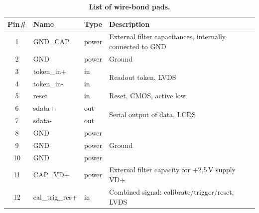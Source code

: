 \begin{table}[ht]
    \begin{center}
	\caption{\textbf{List of wire-bond pads.} }
	\label{tab:ROCpinout}

	\bigskip

	{\scriptsize
	\begin{tabular}{clll}
	\toprule %
	Pin\# & Name         & Type & Description \\
	\midrule %
	 1 & GND\_CAP        & power & External filter capacitances, internally connected to GND \\
	\midrule %
	 2 & GND             & power  & Ground \\
	\midrule %
	 3 & token\_in+      & in  & \multirow{2}{*}{Readout token, LVDS} \\
	 4 & token\_in-      & in  & \\
	\midrule %
	 5 & $\overline{\mathrm{reset}}$           & in  & Reset, CMOS, active low\\
	\midrule %
	 6 & sdata+           & out & \multirow{2}{*}{Serial output of data, LCDS} \\
	 7 & sdata-           & out & \\
	\midrule %
	 8 & GND             &  power  & \multirow{3}{*}{Ground}  \\
	 9 & GND             &  power & \\
	10 & GND             &  power & \\
	\midrule %
	11 & CAP\_VD+        & power & External filter capacity for +2.5\,V supply VD+ \\
	\midrule %
	12 & cal\_trig\_res+ & in  &  \multirow{2}{*}{Combined signal: calibrate/trigger/reset, LVDS} \\

\end{tabular}}
\end{center}
\end{table}
